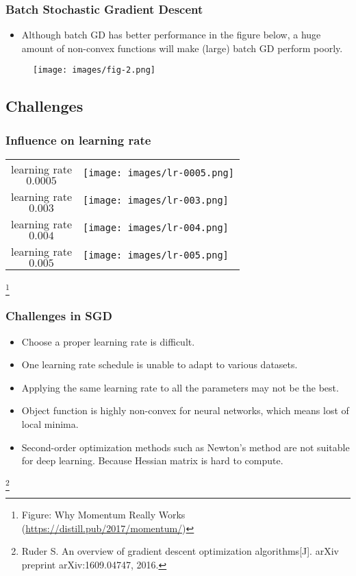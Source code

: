 \documentclass[10pt]{beamer}
\theoremstyle{mystyle}
\newcommand\blfootnote[1]{%
  \begingroup
  \renewcommand\thefootnote{}\footnote[frame]{#1}%
  \addtocounter{footnote}{-1}%
  \endgroup
}
\theoremstyle{mystyle}
\begin{document}
\begin{frame}
	\frametitle{Batch Stochastic Gradient Descent}
	\begin{itemize}
		\item Although batch GD has better performance in the figure below, a huge amount of non-convex functions will make (large) batch GD perform poorly.
	\end{itemize}
	\begin{figure}[H]
		\centering
		\texttt{[image: images/fig-2.png]}
	\end{figure}
\end{frame}

\subsection{Challenges}
\begin{frame}
	\frametitle{Influence on learning rate}
	\centering
		\begin{tabular}{m{4cm} m{12cm}}
			learning rate $$ 0.0005 $$ &
			\texttt{[image: images/lr-0005.png]} \\
			learning rate $$ 0.003 $$ &
			\texttt{[image: images/lr-003.png]} \\
			learning rate $$ 0.004 $$ &
			\texttt{[image: images/lr-004.png]} \\
			learning rate $$ 0.005 $$ &
			\texttt{[image: images/lr-005.png]} \\
		\end{tabular}
	\blfootnote{Figure: Why Momentum Really Works (\url{https://distill.pub/2017/momentum/})}
\end{frame}

\begin{frame}
	\frametitle{Challenges in SGD}
	\begin{itemize}
		\item Choose a proper learning rate is difficult.
		\item One learning rate schedule is unable to adapt to various datasets.
		\item Applying the same learning rate to all the parameters may not be the best.
		\item Object function is highly non-convex for neural networks, which means lost of local minima.
		\item Second-order optimization methods such as Newton's method are not suitable for deep learning. Because Hessian matrix is hard to compute.
	\end{itemize}
	\blfootnote{Ruder S. An overview of gradient descent optimization algorithms[J]. arXiv preprint arXiv:1609.04747, 2016.}
\end{frame}
\end{document}
